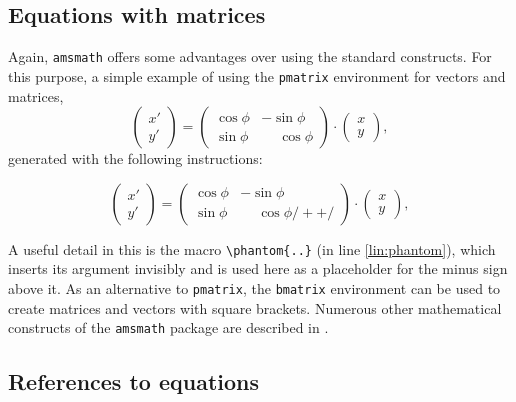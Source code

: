 \subsection{Equations with matrices}

Again, \texttt{amsmath} offers some advantages over using the standard \latex
constructs. For this purpose, a simple example of using the \texttt{pmatrix}
environment for vectors and matrices,
%
\begin{equation}
	\begin{pmatrix}
		x' \\ y'
	\end{pmatrix}
	=
	\begin{pmatrix}
		\cos \phi & -\sin \phi           \\
		\sin \phi & \phantom{-}\cos \phi
	\end{pmatrix}
	\cdot
	\begin{pmatrix}
		x \\ y
	\end{pmatrix} ,
\end{equation}
%
generated with the following instructions:
%
\begin{LaTeXCode}
\begin{equation}
	\begin{pmatrix} 
			x' \\ 
			y' 
	\end{pmatrix}
	= 
	\begin{pmatrix}
		  \cos \phi &          -\sin \phi \\
		  \sin \phi & \phantom{-}\cos \phi /+ \label{lin:phantom} +/
	\end{pmatrix} 
	\cdot
	\begin{pmatrix} 
			x \\ 
			y 
	\end{pmatrix} ,
\end{equation}
\end{LaTeXCode}
%
A useful detail in this is the \tex macro \verb!\phantom{..}! (in line 
\ref{lin:phantom}), which inserts its argument invisibly and is used here
as a placeholder for the minus sign above it.
As an alternative to \texttt{pmatrix}, the \texttt{bmatrix} environment can
be used to create matrices and vectors with square brackets.
Numerous other mathematical constructs of the \texttt{amsmath} package are
described in \cite{Mittelbach2022}.


\subsection{References to equations}
\label{sec:ReferencesToEquations}

